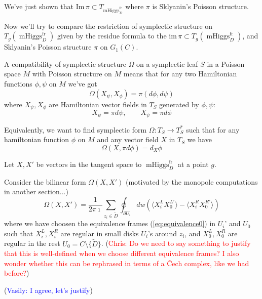 \documentclass[11pt, oneside, reqno]{amsart}
\theoremstyle{definition} \newtheorem{definition}{Definition}[section]
\theoremstyle{definition} \newtheorem{remark}[definition]{Remark}
\theoremstyle{definition} \newtheorem{remarks}[definition]{Remarks}
\theoremstyle{definition} \newtheorem{question}[definition]{Question}
\theoremstyle{definition} \newtheorem*{note}{Note}
\theoremstyle{definition} \newtheorem{example}[definition]{Example}
\theoremstyle{definition} \newtheorem{examples}[definition]{Examples}
\DeclareMathOperator{\mhiggs}{mHiggs}
\newcommand{\fr}{\mathrm{fr}}
\newcommand{\chris}[1]{(\textcolor{red}{Chris: #1})}
\newcommand{\vasily}[1]{(\textcolor{blue}{Vasily: #1})}
\begin{document}
We've just shown that $\mathrm{Im} \, \pi \subset T_{\mhiggs^{\fr}_{D}}$ where
$\pi$ is Sklyanin's Poisson structure. 

Now we'll try to compare the restriction of symplectic
structure on $T_{g}(\mhiggs^{\fr}_{D})$ given by the residue formula to the $\mathrm{im} \, \pi
\subset T_{g}(\mhiggs^{\fr}_D)$, and Sklyanin's Poisson structure $\pi$ on $G_1(C)$. 

 A compatibility of symplectic structure $\Omega$ on a symplectic leaf $S$ in a Poisson space $M$
 with Poisson structure on $M$  means that for any two Hamiltonian functions $\phi, \psi$ on $M$
 we've got
 \begin{equation}
\label{eq:compatibility}
   \Omega(X_{\psi}, X_{\phi}) = \pi (d\phi, d \psi)
 \end{equation}
 where $X_{\psi}, X_{\phi}$ are Hamiltonian vector fields in $T_{S}$ generated by $\phi, \psi$:
 \begin{equation}
   X_{\psi} = \pi d \psi, \qquad X_{\psi} = \pi d \phi 
 \end{equation}

 Equivalently, we want to find symplectic form $\Omega: T_{S} \to T_{S}^{*} $ such
 that for any hamiltonian function $\phi$ on $M$ and any vector field $X$ in $T_{S}$ we
 have
 \begin{equation}
   \Omega(X, \pi d \phi) = d_{X} \phi 
 \end{equation}

 Let $X, X'$ be vectors in the tangent space to $\mhiggs^{\fr}_D$ at a point $g$.

 Consider the bilinear form $\Omega(X, X')$ (motivated by the monopole
 computations in another section...) 
 \begin{equation}
\label{eq:Omega}
   \Omega(X, X')  = \frac{1}{2 \pi \imath} \sum_{z_i \in \tilde D} \oint_{\partial U_i}  dw (
\langle  X^{L}_{i} X^{L'}_{0} \rangle  - \langle X^{R}_{i}  X^{R'}_{0} \rangle )
\end{equation}
where we have choosen the equivalence frames (\ref{eq:equivalence0}) in $U_i$' and $U_0$ such that $X_i^{L}, X_i^{R}$ are regular in small disks $U_i$'s around $z_i$, and $X_0^{L}, X_{0}^{R}$ are regular in
the rest $U_0  = C \setminus \{\tilde D\}$. \chris{Do we need to say something to justify that this is well-defined when we choose different equivalence frames?  I also wonder whether this can be rephrased in terms of a \v Cech complex, like we had before?}

\vasily{I agree, let's justify}  
\end{document}
